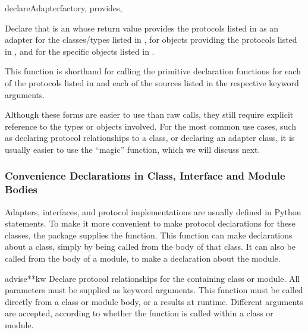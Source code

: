 \begin{verbatim%
}
\begin{verbatim%
}
\begin{verbatim%
}
\begin{verbatim%
}
\begin{funcdesc}{declareAdapter}{factory, provides,
 
}

Declare that  is an  whose return value
provides the protocols listed in  as an adapter for the
classes/types listed in , for objects providing the protocols
listed in , and for the specific objects listed in
.

This function is shorthand for calling the primitive declaration
functions for each of the protocols listed in  and each of the
sources listed in the respective keyword arguments.
\end{funcdesc}

Although these forms are easier to use than raw 
calls, they still require explicit reference to the types or objects involved.
For the most common use cases, such as declaring protocol relationships to a
class, or declaring an adapter class, it is usually easier to use the ``magic''
 function, which we will discuss next.



















\subsubsection{Convenience Declarations in Class, Interface and Module Bodies \label{protcols-advise}}

Adapters, interfaces, and protocol implementations are usually defined in
Python  statements.  To make it more convenient to make protocol
declarations for these classes, the  package supplies the
 function.  This function  can make declarations about a
class, simply by being called from the body of that class.  It can also be
called from the body of a module, to make a declaration about the module.

\begin{funcdesc}{advise}{**kw}
Declare protocol relationships for the containing class or module.  All
parameters must be supplied as keyword arguments.  This function must be
called directly from a class or module body, or a 
results at runtime.  Different arguments are accepted, according to whether
the function is called within a class or module.


\end{funcdesc}
\end{verbatim%
}
\end{verbatim%
}
\end{verbatim%
}
\end{verbatim%
}
